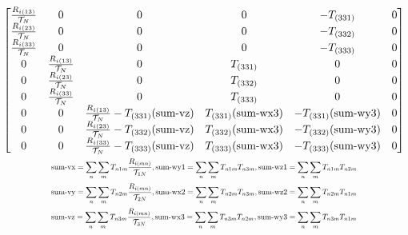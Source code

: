 \begin{landscape}
\begin{equation}
\begin{gathered}
{\begin{bmatrix}
    \frac{R_{i(13)}}{\mathcal{T}_{N}} & 0 & 0 & 0 & - T_{(331)} & 0 \\
    \frac{R_{i(23)}}{\mathcal{T}_{N}} & 0 & 0 & 0 & - T_{(332)} & 0 \\
    \frac{R_{i(33)}}{\mathcal{T}_{N}} & 0 & 0 & 0 & - T_{(333)} & 0 \\

    0 & \frac{R_{i(13)}}{\mathcal{T}_{N}} & 0 & T_{(331)} & 0 & 0\\
    0 & \frac{R_{i(23)}}{\mathcal{T}_{N}} & 0 & T_{(332)} & 0 & 0\\
    0 & \frac{R_{i(33)}}{\mathcal{T}_{N}} & 0 & T_{(333)} & 0 & 0\\

    0 & 0 & \frac{R_{i(13)}}{\mathcal{T}_{N}} -T_{(331)}(\text{sum-vz}) & T_{(331)}(\text{sum-wx3}) & - T_{(331)}(\text{sum-wy3})& 0 \\
    0 & 0 & \frac{R_{i(23)}}{\mathcal{T}_{N}} -T_{(332)}(\text{sum-vz}) & T_{(332)}(\text{sum-wx3}) & - T_{(332)}(\text{sum-wy3})& 0 \\
    0 & 0 & \frac{R_{i(33)}}{\mathcal{T}_{N}} -T_{(333)}(\text{sum-vz}) & T_{(333)}(\text{sum-wx3}) & - T_{(333)}(\text{sum-wy3})& 0
  \end{bmatrix}
}\\
\scalemath{0.70}{
  \text{sum-vx} = \sum_n \sum_m T_{n1m}\frac{R_{i(mn)}}{\mathcal{T}_{1N}}, \text{sum-wy1} = \sum_n \sum_{m}T_{n1m}T_{n3m}, \text{sum-wz1} = \sum_n \sum_{m}T_{n1m}T_{n2m}
}\\
\scalemath{0.70}{
  \text{sum-vy} = \sum_n \sum_m T_{n2m}\frac{R_{i(mn)}}{\mathcal{T}_{2N}}, \text{sum-wx2} = \sum_n \sum_{m}T_{n2m}T_{n3m}, \text{sum-wz2} = \sum_n \sum_{m}T_{n2m}T_{n1m}
}\\
\scalemath{0.70}{
  \text{sum-vz} = \sum_n \sum_m T_{n3m}\frac{R_{i(mn)}}{\mathcal{T}_{3N}}, \text{sum-wx3} = \sum_n \sum_{m}T_{n3m}T_{n2m}, \text{sum-wy3} = \sum_n \sum_{m}T_{n3m}T_{n1m}
}
\end{gathered}\label{eq:interactionmatrixnormalizeddesired}
\end{equation}
\end{landscape}
